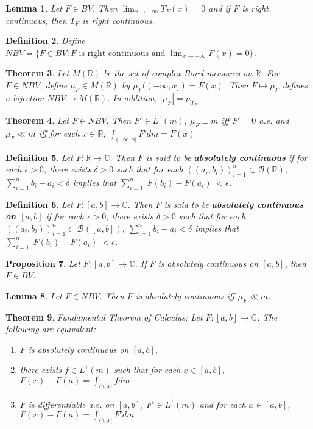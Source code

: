 \documentclass[12pt]{amsart}
\newtheorem{thm}{Theorem}[section]
\newtheorem{lem}[thm]{Lemma}
\newtheorem{prop}[thm]{Proposition}
\newtheorem{defn}[thm]{Definition}
\newcommand{\del}{\delta}
\newcommand{\ep}{\epsilon}
\newcommand{\C}{\mathbb{C}}
\newcommand{\R}{\mathbb{R}}
\newcommand{\MB}{\mathcal{B}}
\begin{document}
\begin{lem}
Let $F \in BV$. Then $\lim_{x \rightarrow -\infty}T_F(x)=0$ and if $F$ is right continuous, then $T_F$ is right continuous.
\end{lem}

\begin{defn}
Define $NBV=\{F \in BV: F \text{ is right continuous and }\lim_{x \rightarrow -\infty}F(x)=0\}$.
\end{defn}

\begin{thm}
Let $M(\R)$ be the set of complex Borel measures on $\R$. For $F \in NBV$, define $\mu_F \in M(\R)$ by $\mu_F((-\infty, x]) = F(x)$. Then $F \mapsto \mu_F$ defines a bijection $NBV \rightarrow M(\R)$. In addition, $|\mu_F| = \mu_{T_F}$
\end{thm}

\begin{thm}
Let $F \in NBV$. Then $F' \in L^1(m)$, $\mu_F \perp m$ iff $F' =0$ a.e. and $\mu_F \ll m$ iff for each $x \in \R$, $\int_{(-\infty, x]}F'dm = F(x)$
\end{thm}

\begin{defn}
Let $F: \R \rightarrow \C$. Then $F$ is said to be \textbf{absolutely continuous} if for each $\ep>0$, there exists $\del>0$ such that for each $((a_i, b_i))_{i=1}^n \subset \MB(\R)$, $\sum_{i=1}^n b_i-a_i < \del$ implies that $\sum_{i=1}^n|F(b_i)-F(a_i)| < \ep$.
\end{defn}

\begin{defn}
Let $F: [a,b] \rightarrow \C$. Then $F$ is said to be \textbf{absolutely continuous on $[a,b]$} if for each $\ep>0$, there exists $\del>0$ such that for each $((a_i, b_i))_{i=1}^n \subset \MB([a,b])$, $\sum_{i=1}^n b_i-a_i < \del$ implies that $\sum_{i=1}^n|F(b_i)-F(a_i)| < \ep$.
\end{defn}

\begin{prop}
Let $F:[a,b] \rightarrow \C$. If $F$ is absolutely continuous on $[a,b]$, then $F \in BV$.
\end{prop}

\begin{lem}
Let $F \in NBV$. Then $F$ is absolutely continuous iff $\mu_F \ll m$.
\end{lem}

\begin{thm}{Fundamental Theorem of Calculus:}
Let $F:[a,b] \rightarrow \C$. The following are equivalent:
\begin{enumerate}
\item $F$ is absolutely continuous on $[a,b]$.
\item there exists $f \in L^1(m)$ such that for each $x \in [a,b]$, $F(x)-F(a)= \int_{(a,x]}fdm$
\item $F$ is differentiable a.e. on $[a,b]$, $F' \in L^1(m)$ and for each $x \in [a,b]$, $F(x)-F(a)=\int_{(a,x]}F'dm$
\end{enumerate}
\end{thm}
\end{document}
